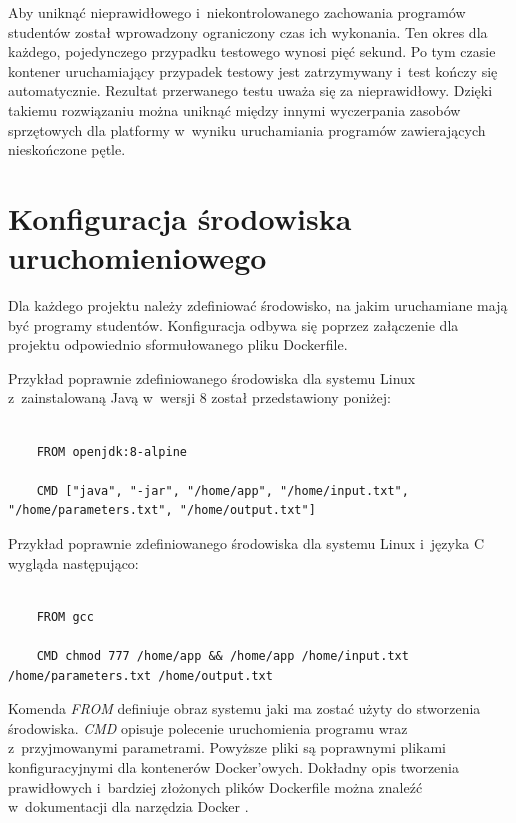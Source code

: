 Aby uniknąć nieprawidłowego i~niekontrolowanego zachowania programów studentów został wprowadzony ograniczony czas ich wykonania.
Ten okres dla każdego, pojedynczego przypadku testowego wynosi pięć sekund.
Po tym czasie kontener uruchamiający przypadek testowy jest zatrzymywany i~test kończy się automatycznie.
Rezultat przerwanego testu uważa się za nieprawidłowy.
Dzięki takiemu rozwiązaniu można uniknąć między innymi wyczerpania zasobów sprzętowych dla platformy w~wyniku uruchamiania programów zawierających nieskończone pętle.


\section {Konfiguracja środowiska uruchomieniowego}
\label{environment_configuration}

Dla każdego projektu należy zdefiniować środowisko, na jakim uruchamiane mają być programy studentów.
Konfiguracja odbywa się poprzez załączenie dla projektu odpowiednio sformułowanego pliku Dockerfile.

Przykład poprawnie zdefiniowanego środowiska dla systemu Linux z~zainstalowaną Javą w~wersji 8 został przedstawiony poniżej:

{\selectfont
\tiny
\begin{lstlisting}

    FROM openjdk:8-alpine

    CMD ["java", "-jar", "/home/app", "/home/input.txt", "/home/parameters.txt", "/home/output.txt"]

\end{lstlisting}
}

Przykład poprawnie zdefiniowanego środowiska dla systemu Linux i~języka C wygląda następująco:

{\selectfont
\tiny
\begin{lstlisting}

    FROM gcc

    CMD chmod 777 /home/app && /home/app /home/input.txt /home/parameters.txt /home/output.txt

\end{lstlisting}
}

Komenda \textit{FROM} definiuje obraz systemu jaki ma zostać użyty do stworzenia środowiska.
\textit{CMD} opisuje polecenie uruchomienia programu wraz z~przyjmowanymi parametrami.
Powyższe pliki są poprawnymi plikami konfiguracyjnymi dla kontenerów Docker'owych.
Dokładny opis tworzenia prawidłowych i~bardziej złożonych plików Dockerfile można znaleźć w~dokumentacji dla narzędzia Docker \cite{docker-config}.

